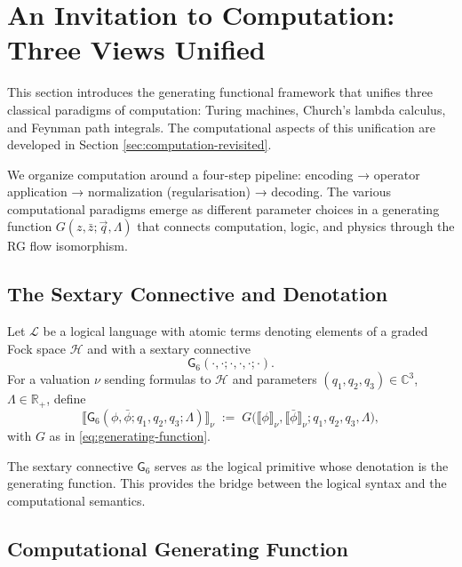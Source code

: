 
\section{An Invitation to Computation: Three Views Unified}
\label{sec:S01_computation_invitation}

This section introduces the generating functional framework that unifies three classical paradigms of computation: Turing machines, Church's lambda calculus, and Feynman path integrals. The computational aspects of this unification are developed in Section \ref{sec:computation-revisited}.

We organize computation around a four-step pipeline: encoding → operator application → normalization (regularisation) → decoding. The various computational paradigms emerge as different parameter choices in a generating function $G(z, \bar{z}; \vec{q}, \Lambda)$ that connects computation, logic, and physics through the RG flow isomorphism.

\subsection{The Sextary Connective and Denotation}

\begin{definition}
\label{def:sextary-connective}
Let $\mathcal{L}$ be a logical language with atomic terms denoting elements of a graded Fock space $\mathcal{H}$ and with a sextary connective
\[
\mathsf{G}_6(\cdot,\cdot;\cdot,\cdot,\cdot;\cdot).
\]
For a valuation $\nu$ sending formulas to $\mathcal{H}$ and parameters $(q_1,q_2,q_3)\in\mathbb{C}^3$, $\Lambda\in\mathbb{R}_+$, define
\[
\llbracket \mathsf{G}_6(\phi,\bar\phi;q_1,q_2,q_3;\Lambda)\rrbracket_\nu
\;:=\;
G\big(\llbracket\phi\rrbracket_\nu,\llbracket\bar\phi\rrbracket_\nu;q_1,q_2,q_3,\Lambda\big),
\]
with $G$ as in \eqref{eq:generating-function}.
\end{definition}

The sextary connective $\mathsf{G}_6$ serves as the logical primitive whose denotation is the generating function. This provides the bridge between the logical syntax and the computational semantics.

\subsection{Computational Generating Function}

